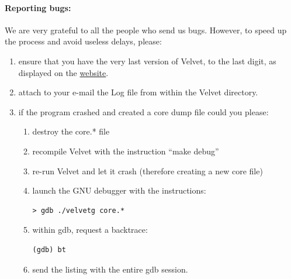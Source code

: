 \documentclass{article}
\begin{document}
\paragraph{Reporting bugs:}

We are very grateful to all the people who send us bugs. However, to speed up the process and avoid useless delays, please:
\begin{enumerate}
\item ensure that you have the very last version of Velvet, to the last digit, as displayed on the \href{http://www.ebi.ac.uk/~zerbino/velvet/}{website}.
\item attach to your e-mail the Log file from within the Velvet directory.
\item if the program crashed and created a core dump file could you please:
\begin{enumerate}
\item destroy the core.* file
\item recompile Velvet with the instruction ``make debug''
\item re-run Velvet and let it crash (therefore creating a new core file)
\item launch the GNU debugger with the instructions:
\begin{verbatim}
> gdb ./velvetg core.*
\end{verbatim}
\item within gdb, request a backtrace:
\begin{verbatim}
(gdb) bt
\end{verbatim}
\item send the listing with the entire gdb session.
\end{enumerate}
\end{enumerate}
\end{document}
